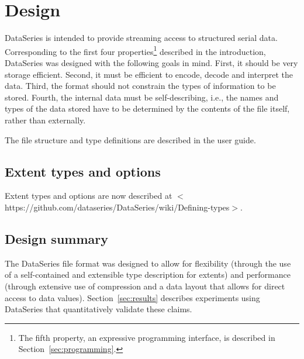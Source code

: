\section{Design}\label{sec:design}

DataSeries is intended to provide streaming access to structured serial
data. Corresponding
to the first four properties\footnote{The fifth property, an expressive
programming interface, is described in Section~\ref{sec:programming}.}
described in the introduction, DataSeries was designed with the
following goals in mind. First, it should be very storage
efficient. Second, it must be efficient to encode, decode and
interpret the data.  Third, the format should not constrain the
types of information to be stored. Fourth, the internal data must be
self-describing, i.e., the names and types of the data stored have to
be determined by the contents of the file itself, rather than 
externally.

The file structure and type definitions are described in the user guide.
% 

\subsection{Extent types and options}\label{sec:extenttype}

Extent types and options are now described at
$<$https://github.com/dataseries/DataSeries/wiki/Defining-types$>$.

\subsection{Design summary}

The DataSeries file format was designed to allow for flexibility
(through the use of a self-contained and extensible type description
for extents) and performance (through extensive use of compression and
a data layout that allows for direct access to data values). 
Section~\ref{sec:results} describes experiments using
DataSeries that quantitatively validate these claims.



